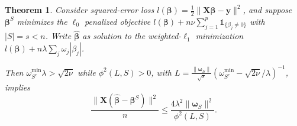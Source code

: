 \documentclass[12pt]{article}
\newtheorem{theorem}{\sc Theorem}[section]
\newcommand{\bs}[1]{\boldsymbol{#1}}
\newcommand{\mr}[1]{\mathrm{#1}}
\newcommand{\bm}[1]{\mathbf{#1}}
\newcommand{\ds}[1]{\mathds{#1}}
\begin{document}
\begin{theorem} \label{thm:sparseapprox}  Consider squared-error loss
$l(\bs{\beta}) =
\frac{1}{2}\|\bm{X}\bs{\beta}-\bm{y}\|^2$, and suppose $\bs{\beta}^{S}$ minimizes the $\ell_0$ penalized objective $l(\bs{\beta}) + n\nu\sum_{j=1}^p\ds{1}_{\{\beta_j\neq0\}}$ with  $|S|=s<n$.   
Write $\bs{\hat\beta}$ as solution to the weighted-$\ell_1$ minimization $l(\bs{\beta}) + n\lambda\sum_j\omega_j|\beta_j|$. 

Then  
$\omega^{\mr{min}}_{S^c}\lambda > \sqrt{2\nu}$ while $\phi^2(L,S) > 0$, with 
 $L = \frac{\|\bs{\omega}_S\|}{\sqrt{s}}\left(\omega^{\mr{min}}_{S^c}-\sqrt{2\nu}/\lambda\right)^{-1}$, implies
\begin{equation} \label{sparseineq}
\frac{\|\bm{X}(\bs{\hat\beta}-\bs{\beta}^S)\|^2}{n}\leq
\frac{4\lambda^2 \|\bs{\omega}_S\|^2}{\phi^2(L, S)}.
\end{equation} 
\end{theorem}
\end{document}
